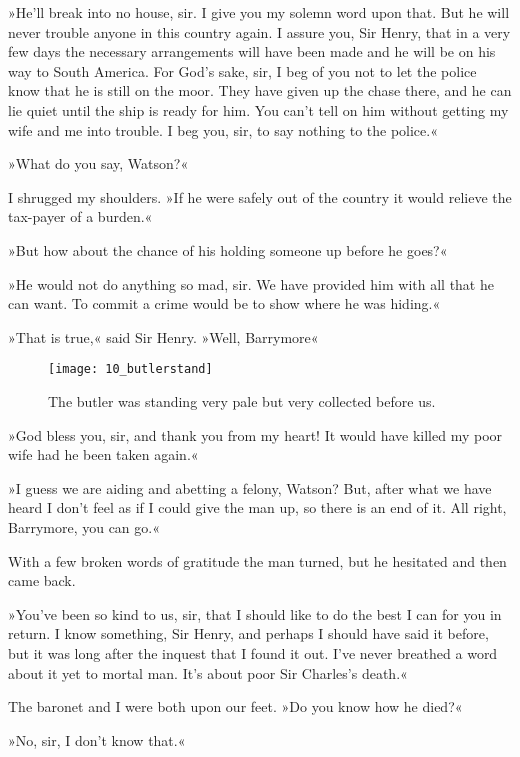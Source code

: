 »He'll break into no house, sir. I give you my solemn word upon that. But he will never trouble anyone in this country again. I assure you, Sir Henry, that in a very few days the necessary arrangements will have been made and he will be on his way to South America. For God's sake, sir, I beg of you not to let the police know that he is still on the moor. They have given up the chase there, and he can lie quiet until the ship is ready for him. You can't tell on him without getting my wife and me into trouble. I beg you, sir, to say nothing to the police.«



»What do you say, Watson?«

I shrugged my shoulders. »If he were safely out of the country it would relieve the tax-payer of a burden.«

»But how about the chance of his holding someone up before he goes?«

»He would not do anything so mad, sir. We have provided him with all that he can want. To commit a crime would be to show where he was hiding.«

»That is true,« said Sir Henry. »Well, Barrymore\longdash«

	\begin{figure}[tbh]
		\centering
		\texttt{[image: 10\_butlerstand]}
		\caption{The butler was standing very pale but very collected before us.}
	\end{figure}

»God bless you, sir, and thank you from my heart! It would have killed my poor wife had he been taken again.«

»I guess we are aiding and abetting a felony, Watson? But, after what we have heard I don't feel as if I could give the man up, so there is an end of it. All right, Barrymore, you can go.«

With a few broken words of gratitude the man turned, but he hesitated and then came back.

»You've been so kind to us, sir, that I should like to do the best I can for you in return. I know something, Sir Henry, and perhaps I should have said it before, but it was long after the inquest that I found it out. I've never breathed a word about it yet to mortal man. It's about poor Sir Charles's death.«

The baronet and I were both upon our feet. »Do you know how he died?«

»No, sir, I don't know that.«

